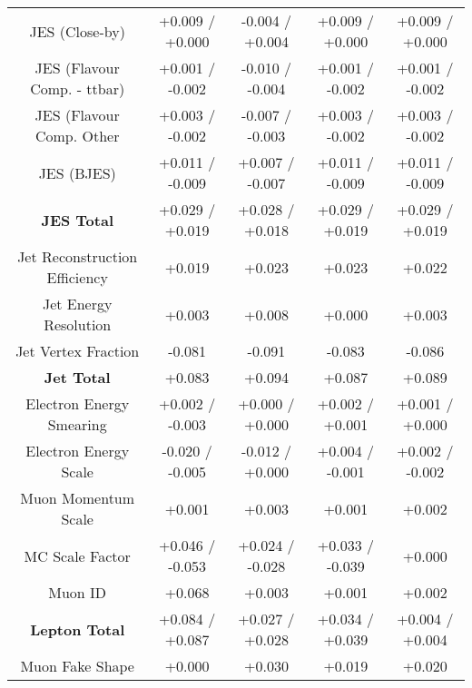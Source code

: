 \begin{table}[htbp]
\begin{center}
\begin{tabular}{|c|c|c|c|c|}
JES (Close-by)                        &+0.009   / +0.000   & -0.004   / +0.004   & +0.009   / +0.000   & +0.009   / +0.000  \\
JES (Flavour Comp. - ttbar)           &+0.001   / -0.002   & -0.010   / -0.004   & +0.001   / -0.002   & +0.001   / -0.002  \\
JES (Flavour Comp. Other              &+0.003   / -0.002   & -0.007   / -0.003   & +0.003   / -0.002   & +0.003   / -0.002  \\
JES (BJES)                            &+0.011   / -0.009   & +0.007   / -0.007   & +0.011   / -0.009   & +0.011   / -0.009  \\
\hline
\textbf{JES Total}                    &+0.029   / +0.019   & +0.028   / +0.018   & +0.029   / +0.019   & +0.029   / +0.019  \\
\hline
Jet Reconstruction Efficiency         &+0.019              & +0.023              & +0.023              & +0.022             \\
Jet Energy Resolution                 &+0.003              & +0.008              & +0.000              & +0.003             \\
Jet Vertex Fraction                   &-0.081              & -0.091              & -0.083              & -0.086             \\
\hline
\textbf{Jet Total}                    &+0.083              & +0.094              & +0.087              & +0.089             \\
\hline
Electron Energy Smearing              &+0.002   / -0.003   & +0.000   / +0.000   & +0.002   / +0.001   & +0.001   / +0.000  \\
Electron Energy Scale                 &-0.020   / -0.005   & -0.012   / +0.000   & +0.004   / -0.001   & +0.002   / -0.002  \\
Muon Momentum Scale                   &+0.001              & +0.003              & +0.001              & +0.002             \\
MC Scale Factor                       &+0.046   / -0.053   & +0.024   / -0.028   & +0.033   / -0.039   & +0.000             \\
Muon ID                               &+0.068              & +0.003              & +0.001              & +0.002             \\
\hline
\textbf{Lepton Total}                 &+0.084   / +0.087   & +0.027   / +0.028   & +0.034   / +0.039   & +0.004   / +0.004  \\
\hline
Muon Fake Shape                       &+0.000              & +0.030              & +0.019              & +0.020             \\

\end{tabular}
\end{center}
\end{table}
